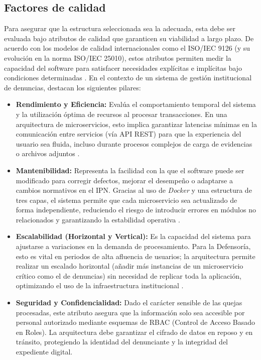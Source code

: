 \subsection{Factores de calidad}

Para asegurar que la estructura seleccionada sea la adecuada, esta debe ser evaluada bajo atributos de calidad que garanticen su viabilidad a largo plazo. De acuerdo con los modelos de calidad internacionales como el ISO/IEC 9126 (y su evolución en la norma ISO/IEC 25010), estos atributos permiten medir la capacidad del software para satisfacer necesidades explícitas e implícitas bajo condiciones determinadas \cite{28} . En el contexto de un sistema de gestión institucional de denuncias, destacan los siguientes pilares:

\begin{itemize}
\item \textbf{Rendimiento y Eficiencia:} Evalúa el comportamiento temporal del sistema y la utilización óptima de recursos al procesar transacciones. En una arquitectura de microservicios, esto implica garantizar latencias mínimas en la comunicación entre servicios (vía API REST) para que la experiencia del usuario sea fluida, incluso durante procesos complejos de carga de evidencias o archivos adjuntos \cite{28} .

\item \textbf{Mantenibilidad:} Representa la facilidad con la que el software puede ser modificado para corregir defectos, mejorar el desempeño o adaptarse a cambios normativos en el IPN. Gracias al uso de \textit{Docker} y una estructura de tres capas, el sistema permite que cada microservicio sea actualizado de forma independiente, reduciendo el riesgo de introducir errores en módulos no relacionados y garantizando la estabilidad operativa \cite{28} .

\item \textbf{Escalabilidad (Horizontal y Vertical):} Es la capacidad del sistema para ajustarse a variaciones en la demanda de procesamiento. Para la Defensoría, esto es vital en periodos de alta afluencia de usuarios; la arquitectura permite realizar un escalado horizontal (añadir más instancias de un microservicio crítico como el de denuncias) sin necesidad de replicar toda la aplicación, optimizando el uso de la infraestructura institucional \cite{29} .

\item \textbf{Seguridad y Confidencialidad:} Dado el carácter sensible de las quejas procesadas, este atributo asegura que la información solo sea accesible por personal autorizado mediante esquemas de RBAC (Control de Acceso Basado en Roles). La arquitectura debe garantizar el cifrado de datos en reposo y en tránsito, protegiendo la identidad del denunciante y la integridad del expediente digital.


\end{itemize}
